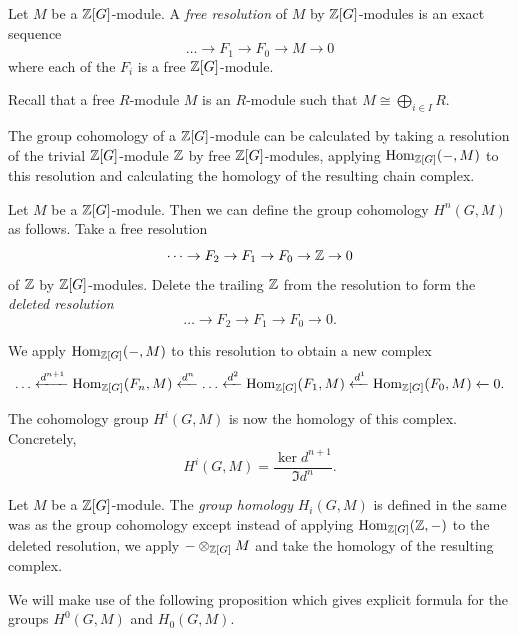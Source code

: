 \begin{definition}
    Let $M$ be a $\mathbb{Z}[G]$-module. A \emph{free resolution} of $M$ by $\mathbb{Z}[G]$-modules is an exact sequence
    $$
        \dots \to F_1 \to F_0 \to M \to 0
    $$
    where each of the $F_i$ is a free $\mathbb{Z}[G]$-module.
\end{definition}
\begin{remark}
    Recall that a free $R$-module $M$ is an $R$-module such that $M \cong \bigoplus_{i \in I} R$.
\end{remark}
The group cohomology of a $\mathbb{Z}[G]$-module can be calculated by taking a
resolution of the trivial $\mathbb{Z}[G]$-module $\mathbb{Z}$ by free $\mathbb{Z}[G]$-modules,
applying $\operatorname{Hom}_{\mathbb{Z}[G]}(-, M)$ to this resolution and
calculating the homology of the resulting chain complex.
\begin{definition}
    Let $M$ be a $\mathbb{Z}[G]$-module. Then we can define the group cohomology $H^n(G,M)$ as follows. Take a free resolution
    $$
        \dots \to F_2 \to F_1 \to F_0 \to \mathbb{Z} \to 0
    $$
    of $\mathbb{Z}$ by $\mathbb{Z}[G]$-modules. Delete the trailing $\mathbb{Z}$ from the resolution to form the \emph{deleted resolution}
    $$
        \dots \to F_2 \to F_1 \to F_0 \to 0.
    $$

    We apply $\operatorname{Hom}_{\mathbb{Z}[G]}(-, M)$ to this resolution to obtain a new complex $$
        \dots \xleftarrow{d^{n+1}} \operatorname{Hom}_{\mathbb{Z}[G]}(F_n, M) \xleftarrow{d^n} \dots
        \xleftarrow{d^2} \operatorname{Hom}_{\mathbb{Z}[G]}(F_1, M) \xleftarrow{d^1} \operatorname{Hom}_{\mathbb{Z}[G]}(F_0, M)
        \xleftarrow{} 0. $$

    The cohomology group $H^i(G, M)$ is now the homology of this complex.
    Concretely, $$ H^i(G, M) = \dfrac{\ker d^{n+1}}{\Im d^n} .$$
\end{definition}
\begin{definition}
    Let $M$ be a $\mathbb{Z}[G]$-module. The \emph{group homology} $H_i(G,M)$ is defined in the same was as the group cohomology except instead of
    applying $\operatorname{Hom}_{\mathbb{Z}[G]}(\mathbb{Z}, -)$ to the deleted resolution, we apply $- \otimes_{\mathbb{Z}[G]} M$ and take the homology of the resulting complex.
\end{definition}

We will make use of the following proposition which gives explicit formula for
the groups $H^0(G,M)$ and $H_0(G,M)$.

